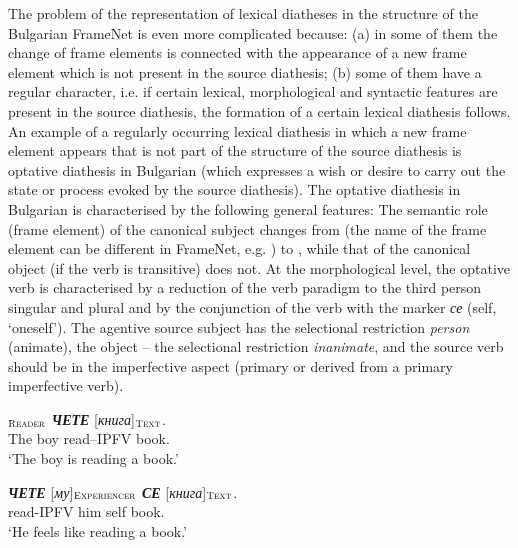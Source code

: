 \documentclass[output=paper,colorlinks,citecolor=brown]{langscibook}
\begin{document}
The problem of the representation of lexical diatheses in the structure of the Bulgarian FrameNet is even more complicated because: (a) in some of them the change of frame elements is connected with the appearance of a new frame element which is not present in the source diathesis; (b) some of them have a regular character, i.e. if certain lexical, morphological and syntactic features are present in the source diathesis, the formation of a certain lexical diathesis follows. An example of a regularly occurring lexical diathesis in which a new frame element appears that is not part of the structure of the source diathesis is optative diathesis in Bulgarian (which expresses a wish or desire to carry out the state or process evoked by the source diathesis).
The optative diathesis in Bulgarian is characterised by the following general features: The semantic role (frame element) of the canonical subject changes from  (the name of the frame element can be different in FrameNet, e.g. ) to , while that of the canonical object (if the verb is transitive) does not. At the morphological level, the optative verb is characterised by a reduction of the verb paradigm to the third person singular and plural and by the conjunction of the verb with the marker \textit{се }(self, `oneself'). The agentive source subject has the selectional restriction \textit{person} (animate), the object -- the selectional restriction \textit{inanimate}, and the source verb should be in the imperfective aspect (primary or derived from a primary imperfective verb).

 \begin{exe}
 \ex  \label{ch01:ex:00}
 $_{\text{\textsc{Reader}}}$   \textit{\textbf{ЧЕТЕ}}  [\textit{книга}]$_{\text{\textsc{Text}}}$.\\
{The boy}  read--IPFV {book}. \\
 \glt `The boy is reading a book.' 
 \end{exe}
 
  \begin{exe}
 \ex  \label{ch01:ex:10}
 \gll   \textit{\textbf{ЧЕТЕ}} [\textit{му}]$_{\text{\textsc{Experiencer}}}$   \textit{\textbf{СЕ}} [\textit{книга}]$_{\text{\textsc{Text}}}$.\\
 read-IPFV {him} self {book}. \\
 \glt `He feels like reading a book.' 
 \end{exe}
 
\end{document}
